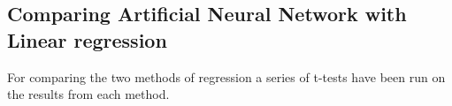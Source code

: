 \subsection{Comparing Artificial Neural Network with Linear regression}
For comparing the two methods of regression a series of t-tests have been run on the results from each method.